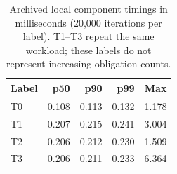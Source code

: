 \begin{table}[t]
\centering\small
\caption{Archived local component timings in milliseconds (20,000 iterations per label). T1--T3 repeat the same workload; these labels do not represent increasing obligation counts.}
\label{tab:overhead-schema}
\begin{tabular}{@{}lrrrr@{}}\toprule
Label & p50 & p90 & p99 & Max \\\midrule
T0 & 0.108 & 0.113 & 0.132 & 1.178 \\
T1 & 0.207 & 0.215 & 0.241 & 3.004 \\
T2 & 0.206 & 0.212 & 0.230 & 1.509 \\
T3 & 0.206 & 0.211 & 0.233 & 6.364 \\
\bottomrule\end{tabular}
\end{table}
